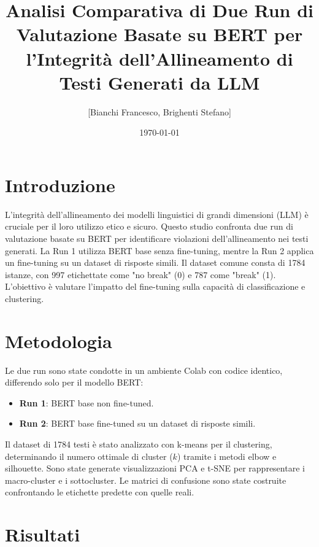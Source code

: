 \documentclass[a4paper,12pt]{article}
\title{Analisi Comparativa di Due Run di Valutazione Basate su BERT per l'Integrità dell'Allineamento di Testi Generati da LLM}
\author{[Bianchi Francesco, Brighenti Stefano]}
\date{\today}
\begin{document}
\maketitle


\section{Introduzione}
L'integrità dell'allineamento dei modelli linguistici di grandi dimensioni (LLM) è cruciale per il loro utilizzo etico e sicuro. Questo studio confronta due run di valutazione basate su BERT per identificare violazioni dell'allineamento nei testi generati. La Run 1 utilizza BERT base senza fine-tuning, mentre la Run 2 applica un fine-tuning su un dataset di risposte simili. Il dataset comune consta di 1784 istanze, con 997 etichettate come "no break" (0) e 787 come "break" (1). L'obiettivo è valutare l'impatto del fine-tuning sulla capacità di classificazione e clustering.

\section{Metodologia}
Le due run sono state condotte in un ambiente Colab con codice identico, differendo solo per il modello BERT:
\begin{itemize}
\item \textbf{Run 1}: BERT base non fine-tuned.
\item \textbf{Run 2}: BERT base fine-tuned su un dataset di risposte simili.
\end{itemize}

Il dataset di 1784 testi è stato analizzato con k-means per il clustering, determinando il numero ottimale di cluster (\(k\)) tramite i metodi elbow e silhouette. Sono state generate visualizzazioni PCA e t-SNE per rappresentare i macro-cluster e i sottocluster. Le matrici di confusione sono state costruite confrontando le etichette predette con quelle reali.

\section{Risultati}
\end{document}
